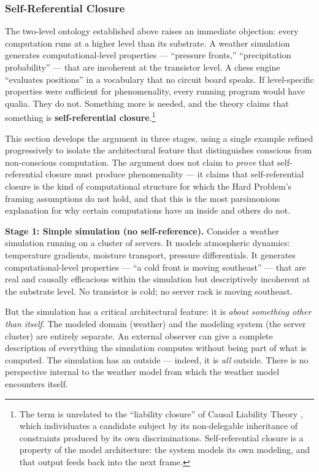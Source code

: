 \documentclass[12pt]{article}
\newcommand{\revstart}{}
\begin{document}
\subsubsection{Self-Referential Closure}


{\revstart The two-level ontology established above raises an immediate objection: every computation runs at a higher level than its substrate. A weather simulation generates computational-level properties --- ``pressure fronts,'' ``precipitation probability'' --- that are incoherent at the transistor level. A chess engine ``evaluates positions'' in a vocabulary that no circuit board speaks. If level-specific properties were sufficient for phenomenality, every running program would have qualia. They do not. Something more is needed, and the theory claims that something is \textbf{self-referential closure}.\footnote{The term is unrelated to the ``liability closure'' of Causal Liability Theory \citep{Khadangi2026}, which individuates a candidate subject by its non-delegable inheritance of constraints produced by its own discriminations. Self-referential closure is a property of the model architecture: the system models its own modeling, and that output feeds back into the next frame.}

This section develops the argument in three stages, using a single example refined progressively to isolate the architectural feature that distinguishes conscious from non-conscious computation. The argument does not claim to \emph{prove} that self-referential closure must produce phenomenality --- it claims that self-referential closure is the kind of computational structure for which the Hard Problem's framing assumptions do not hold, and that this is the most parsimonious explanation for why certain computations have an inside and others do not.

\textbf{Stage 1: Simple simulation (no self-reference).} Consider a weather simulation running on a cluster of servers. It models atmospheric dynamics: temperature gradients, moisture transport, pressure differentials. It generates computational-level properties --- ``a cold front is moving southeast'' --- that are real and causally efficacious within the simulation but descriptively incoherent at the substrate level. No transistor is cold; no server rack is moving southeast.

But the simulation has a critical architectural feature: it is \emph{about something other than itself}. The modeled domain (weather) and the modeling system (the server cluster) are entirely separate. An external observer can give a complete description of everything the simulation computes without being part of what is computed. The simulation has an outside --- indeed, it is \emph{all} outside. There is no perspective internal to the weather model from which the weather model encounters itself.

}
\end{document}

